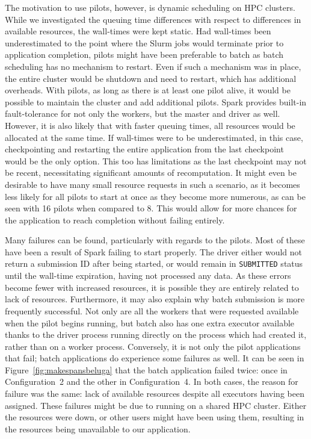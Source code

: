     The motivation to use pilots, however, is dynamic scheduling on HPC clusters. While we
    investigated the queuing time differences with respect to differences in available resources,
    the wall-times were kept static. Had wall-times been underestimated to the point where the Slurm jobs
    would terminate prior to application completion, pilots might have been preferable to batch
    as batch scheduling has no mechanism to restart. Even if such a mechanism was in place, the entire
    cluster would be shutdown and need to restart, which has additional overheads. With pilots, as long as 
    there is at least one pilot alive, it would be possible to maintain the cluster and add additional pilots.
    Spark provides built-in fault-tolerance for not only the workers, but the master and driver as well. However,
    it is also likely that with faster queuing times, all resources would be allocated at the same time. If wall-times
    were to be underestimated, in this case, checkpointing and restarting the entire application from the last
    checkpoint would be the only option. This too has limitations as the last checkpoint may not be recent,
    necessitating significant amounts of recomputation. It
    might even be desirable to have many small resource requests in such a scenario, as it becomes less likely for all pilots to start at once as they become more numerous, as can be seen with 16 pilots when compared to 8. This would allow
    for more chances for the application to reach completion without failing entirely.
    
    Many failures can be found, particularly with regards to the pilots. Most
    of these have been a result of Spark failing to start properly. The driver
    either would not return a submission ID after being started, or would
    remain in \texttt{SUBMITTED} status until the wall-time expiration, having
    not processed any data. As these errors become fewer with increased
    resources, it is possible they are entirely related to lack of resources.
    Furthermore, it may also explain why batch submission is more frequently successful. Not
    only are all the workers that were requested available when the pilot
    begins running, but batch also has one extra executor available thanks to the driver
    process running directly on the process which had created it, rather than on a
    worker process. Conversely, it is not only the pilot applications that
    fail; batch applications do experience some failures as well. It can be
    seen in Figure~\ref{fig:makespansbeluga} that the batch application failed
    twice: once in Configuration~2 and the other in Configuration~4. In both
    cases, the reason for failure was the same: lack of available resources
    despite all executors having been assigned. These failures might be due to
    running on a shared HPC cluster. Either the resources were down, or other users might
    have been using them, resulting in the resources being unavailable to our
    application.
    
